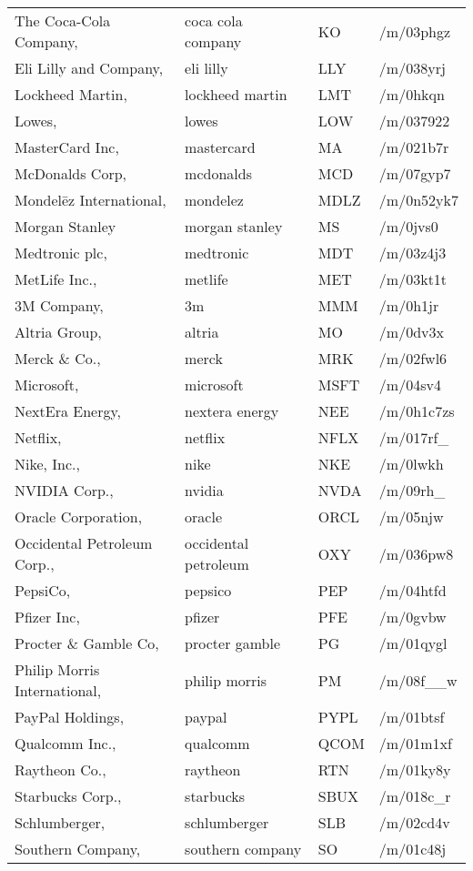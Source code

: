 \begin{longtable}[c]{llll}
The Coca-Cola Company, & coca cola company & KO & /m/03phgz \\
Eli Lilly and Company, & eli lilly & LLY & /m/038yrj \\
Lockheed Martin, & lockheed martin & LMT & /m/0hkqn \\
Lowes, & lowes & LOW & /m/037922 \\
MasterCard Inc, & mastercard & MA & /m/021b7r \\
McDonalds Corp, & mcdonalds & MCD & /m/07gyp7 \\
Mondelēz International, & mondelez & MDLZ & /m/0n52yk7 \\
Morgan Stanley & morgan stanley & MS & /m/0jvs0 \\
Medtronic plc, & medtronic & MDT & /m/03z4j3 \\
MetLife Inc., & metlife & MET & /m/03kt1t \\
3M Company, & 3m & MMM & /m/0h1jr \\
Altria Group, & altria & MO & /m/0dv3x \\
Merck \& Co., & merck & MRK & /m/02fwl6 \\
Microsoft, & microsoft & MSFT & /m/04sv4 \\
NextEra Energy, & nextera energy & NEE & /m/0h1c7zs \\
Netflix, & netflix & NFLX & /m/017rf\_ \\
Nike, Inc., & nike & NKE & /m/0lwkh \\
NVIDIA Corp., & nvidia & NVDA & /m/09rh\_ \\
Oracle Corporation, & oracle & ORCL & /m/05njw \\
Occidental Petroleum Corp., & occidental petroleum & OXY & /m/036pw8 \\
PepsiCo, & pepsico & PEP & /m/04htfd \\
Pfizer Inc, & pfizer & PFE & /m/0gvbw \\
Procter \& Gamble Co, & procter gamble & PG & /m/01qygl \\
Philip Morris International, & philip morris & PM & /m/08f\_\_w \\
PayPal Holdings, & paypal & PYPL & /m/01btsf \\
Qualcomm Inc., & qualcomm & QCOM & /m/01m1xf \\
Raytheon Co., & raytheon & RTN & /m/01ky8y \\
Starbucks Corp., & starbucks & SBUX & /m/018c\_r \\
Schlumberger, & schlumberger & SLB & /m/02cd4v \\
Southern Company, & southern company & SO & /m/01c48j \\

\end{longtable}

